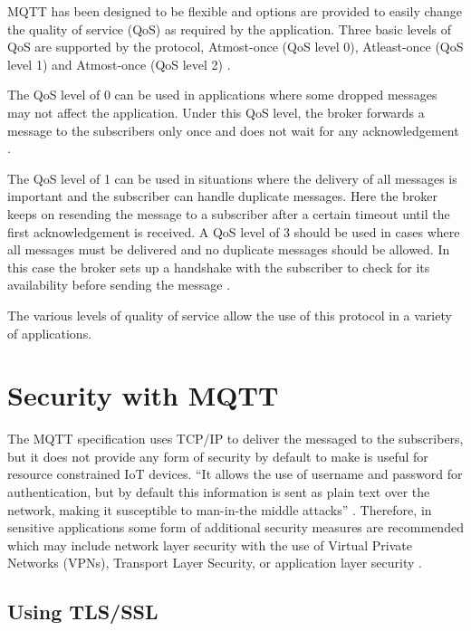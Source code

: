 \documentclass[sigconf]{acmart}
\begin{document}
MQTT has been designed to be flexible and options are provided to
easily change the quality of service (QoS) as required by the
application. Three basic levels of QoS are supported by the protocol,
Atmost-once (QoS level 0), Atleast-once (QoS level 1) and Atmost-once
(QoS level 2) \cite{hivemq-qos}\cite{python-paho-mqtt}.

The QoS level of 0 can be used in applications where some dropped
messages may not affect the application. Under this QoS level, the
broker forwards a message to the subscribers only once and does not
wait for any acknowledgement \cite{hivemq-qos}
\cite{python-paho-mqtt}.

The QoS level of 1 can be used in situations where the delivery of all
messages is important and the subscriber can handle duplicate
messages. Here the broker keeps on resending the message to a
subscriber after a certain timeout until the first acknowledgement is
received. A QoS level of 3 should be used in cases where all messages
must be delivered and no duplicate messages should be allowed. In this
case the broker sets up a handshake with the subscriber to check for
its availability before sending the message \cite{hivemq-qos}
\cite{python-paho-mqtt}.

The various levels of quality of service allow the use of this
protocol in a variety of applications.

\section{Security with MQTT}

The MQTT specification uses TCP/IP to deliver the messaged to the
subscribers, but it does not provide any form of security by default
to make is useful for resource constrained IoT devices. ``It allows
the use of username and password for authentication, but by default
this information is sent as plain text over the network, making it
susceptible to man-in-the middle attacks''
\cite{iot-design-mqtt-security} \cite{mqtt-sec-ssl}. Therefore, in
sensitive applications some form of additional security measures are
recommended which may include network layer security with the use of
Virtual Private Networks (VPNs), Transport Layer Security, or
application layer security \cite{mqtt-sec-ssl}.

\subsection{Using TLS/SSL}
\end{document}
